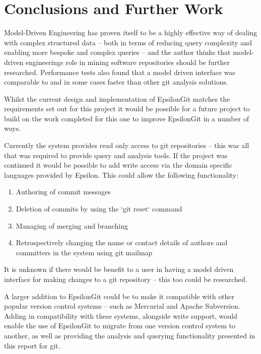 \documentclass[runningheads,a4paper]{llncs}
\begin{document}
\section{Conclusions and Further Work}
Model-Driven Engineering has proven itself to be a highly effective way of dealing with complex structured data -- both in terms of reducing query complexity and enabling more bespoke and complex queries -- and the author thinks that model-driven engineerings role in mining software repositories should be further researched. Performance tests also found that a model driven interface was comparable to and in some cases faster than other git analysis solutions.

Whilst the current design and implementation of EpsilonGit matches the requirements set out for this project it would be possible for a future project to build on the work completed for this one to improve EpsilonGit in a number of ways. 

Currently the system provides read only access to git repositories -- this was all that was required to provide query and analysis tools. If the project was continued it would be possible to add write access via the domain specific languages provided by Epsilon. This could allow the following functionality:

\begin{enumerate}
	\item Authoring of commit messages
	\item Deletion of commits by using the `git reset` command \cite{gitreset}
	\item Managing of merging and branching
	\item Retrospectively changing the name or contact details of authors and committers in the system using git mailmap \cite{gitmailmap}
\end{enumerate} 

It is unknown if there would be benefit to a user in having a model driven interface for making changes to a git repository -- this too could be researched. 

A larger addition to EpsilonGit could be to make it compatible with other popular version control systems -- such as Mercurial and Apache Subversion. Adding in compatibility with these systems, alongside write support, would enable the use of EpsilonGit to migrate from one version control system to another, as well as providing the analysis and querying functionality presented in this report for git.

\clearpage



\end{document}
